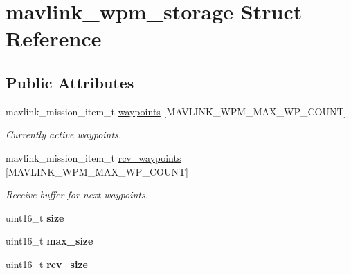 \hypertarget{structmavlink__wpm__storage}{}\section{mavlink\+\_\+wpm\+\_\+storage Struct Reference}
\label{structmavlink__wpm__storage}
\subsection*{Public Attributes}
\begin{DoxyCompactItemize}
\item 
\mbox{\label{structmavlink__wpm__storage_accfec92ea4372aa83ceddba2723a6ba2}} 
mavlink\+\_\+mission\+\_\+item\+\_\+t \hyperlink{structmavlink__wpm__storage_accfec92ea4372aa83ceddba2723a6ba2}{waypoints} \mbox{[}M\+A\+V\+L\+I\+N\+K\+\_\+\+W\+P\+M\+\_\+\+M\+A\+X\+\_\+\+W\+P\+\_\+\+C\+O\+U\+NT\mbox{]}
\begin{DoxyCompactList}\small\item\em Currently active waypoints. \end{DoxyCompactList}\item 
\mbox{\label{structmavlink__wpm__storage_a8c0d2d3554b3e78ef729e4151427df87}} 
mavlink\+\_\+mission\+\_\+item\+\_\+t \hyperlink{structmavlink__wpm__storage_a8c0d2d3554b3e78ef729e4151427df87}{rcv\+\_\+waypoints} \mbox{[}M\+A\+V\+L\+I\+N\+K\+\_\+\+W\+P\+M\+\_\+\+M\+A\+X\+\_\+\+W\+P\+\_\+\+C\+O\+U\+NT\mbox{]}
\begin{DoxyCompactList}\small\item\em Receive buffer for next waypoints. \end{DoxyCompactList}\item 
\mbox{\label{structmavlink__wpm__storage_aa63b350cf3cc42140f4520e0e7d7ff2c}} 
uint16\+\_\+t {\bfseries size}
\item 
\mbox{\label{structmavlink__wpm__storage_ad5724d0f20f959d615f547aa0ac64289}} 
uint16\+\_\+t {\bfseries max\+\_\+size}
\item 
\mbox{\label{structmavlink__wpm__storage_a79483c58f7121a501b9cc60e802c89bf}} 
uint16\+\_\+t {\bfseries rcv\+\_\+size}

\end{DoxyCompactItemize}
